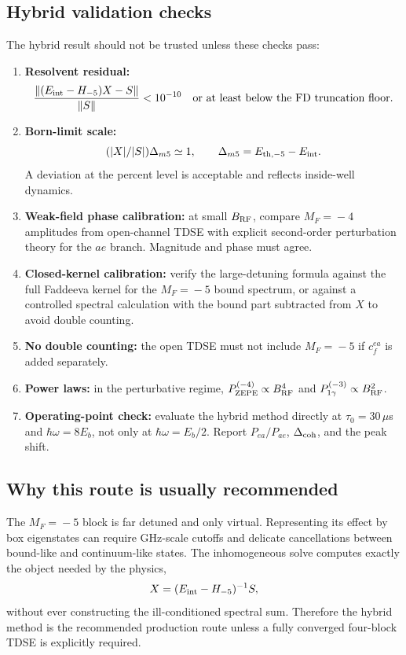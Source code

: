 \documentclass[11pt,a4paper]{article}
\newcommand{\MF}[1]{M_F\!=\!#1}
\begin{document}
\subsection{Hybrid validation checks}

The hybrid result should not be trusted unless these checks pass:
\begin{enumerate}[leftmargin=2em,itemsep=2pt]
\item \textbf{Resolvent residual:}
\begin{equation}
\frac{\|(E_{\rm int}-H_{-5})X-S\|}{\|S\|}<10^{-10}\quad\text{or at least below the FD truncation floor.}
\end{equation}
\item \textbf{Born-limit scale:}
\begin{equation}
(|X|/|S|)\Delta_{m5}\simeq1,
\qquad
\Delta_{m5}=E_{{\rm th},-5}-E_{\rm int}.
\end{equation}
A deviation at the percent level is acceptable and reflects inside-well dynamics.
\item \textbf{Weak-field phase calibration:} at small $B_{\rm RF}$, compare
$\MF{-4}$ amplitudes from open-channel TDSE with explicit second-order
perturbation theory for the $ae$ branch.  Magnitude and phase must agree.
\item \textbf{Closed-kernel calibration:} verify the large-detuning formula
against the full Faddeeva kernel for the $\MF{-5}$ bound spectrum, or against a
controlled spectral calculation with the bound part subtracted from $X$ to avoid
double counting.
\item \textbf{No double counting:} the open TDSE must not include $\MF{-5}$ if
$c_f^{ea}$ is added separately.
\item \textbf{Power laws:} in the perturbative regime,
$P_{\rm ZEPE}^{(-4)}\propto B_{\rm RF}^4$ and $P_{1\gamma}^{(-3)}\propto B_{\rm RF}^2$.
\item \textbf{Operating-point check:} evaluate the hybrid method directly at
$\tau_0=30\,\mu$s and $\hbar\omega=8E_b$, not only at $\hbar\omega=E_b/2$.
Report $P_{ea}/P_{ae}$, $\Delta_{\rm coh}$, and the peak shift.
\end{enumerate}

\subsection{Why this route is usually recommended}

The $\MF{-5}$ block is far detuned and only virtual.  Representing its effect by
box eigenstates can require GHz-scale cutoffs and delicate cancellations between
bound-like and continuum-like states.  The inhomogeneous solve computes exactly
the object needed by the physics,
\begin{equation}
X=(E_{\rm int}-H_{-5})^{-1}S,
\end{equation}
without ever constructing the ill-conditioned spectral sum.  Therefore the
hybrid method is the recommended production route unless a fully converged
four-block TDSE is explicitly required.
\end{document}
